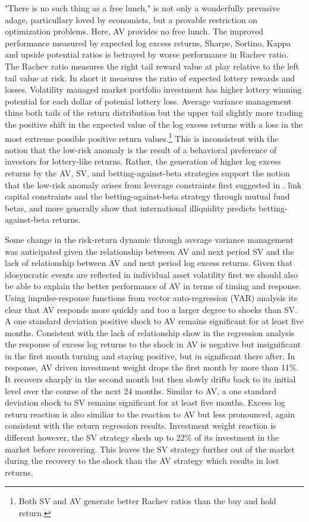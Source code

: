 "There is no such thing as a free lunch," is not only a wonderfully prevasive adage, particullary loved by economists, but a provable restriction on optimization problems.\citep{wolpert_no_1997} Here, AV provides no free lunch. The improved performance measured by expected log excess returns, Sharpe, Sortino, Kappa and upside potential ratios is betrayed by worse performance in Rachev ratio. The Rachev ratio measures the right tail reward value at play relative to the left tail value at risk. In short it measures the ratio of expected lottery rewards and losses. Volatility managed market portfolio investment has higher lottery winning potential for each dollar of potenial lottery loss. Average variance management thins both tails of the return distribution but the upper tail slightly more trading the positive shift in the expected value of the log excess returns with a loss in the most extreme possible positive return values.\footnote{Both SV and AV generate better Rachev ratios than the buy and hold return.} This is inconsistent with the notion that the low-risk anomaly is the result of a behavioral preference of investors for lottery-like returns.\citep{barberis_stocks_2008,brunnermeier_optimal_2007} Rather, the generation of higher log excess returns by the AV, SV, and betting-against-beta strategies support the notion that the low-risk anomaly arises from leverage constraints first suggested in \citet{jensen1972capital}. \citet{boguth_leverage_2018} link capital constraints and the betting-against-beta strategy through mutual fund betas, and more generally \citet{malkhozov_international_2017} show that international illiquidity predicts betting-against-beta returns. 

Some change in the risk-return dynamic through average variance management was anticipated given the relationship between AV and next period SV and the lack of relationship between AV and next period log excess returns. Given that idosyncratic events are reflected in individual asset volatility first we should also be able to explain the better performance of AV in terms of timing and response. Using impulse-response functions from vector auto-regression (VAR) analysis its clear that AV responds more quickly and too a larger degree to shocks than SV. A one standard deviation positive shock to AV remains significant for at least five months. Consistent with the lack of relationship show in the regression analysis the response of excess log returns to the shock in AV is negative but insignificant in the first month turning and staying positive, but in significant there after. In response, AV driven investment weight drops the first month by more than 11\%. It recovers sharply in the second month but then slowly drifts back to its initial level over the course of the next 24 months. Similar to AV, a one standard deviation shock to SV remains significant for at least five months. Excess log return reaction is also similiar to the reaction to AV but less pronounced, again consistent with the return regression results. Investment weight reaction is different however, the SV strategy sheds up to 22\% of its investment in the market before recovering. This leaves the SV strategy further out of the market during the recovery to the shock than the AV strategy which results in lost returns.

